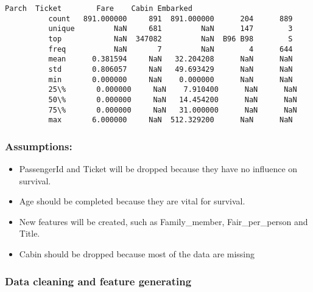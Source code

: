 \documentclass[11pt]{article}
\providecommand{\tightlist}{%
      \setlength{\itemsep}{0pt}\setlength{\parskip}{0pt}}
\begin{document}
\begin{Verbatim}[commandchars=\\\{\}]
                       Parch  Ticket        Fare    Cabin Embarked  
          count   891.000000     891  891.000000      204      889  
          unique         NaN     681         NaN      147        3  
          top            NaN  347082         NaN  B96 B98        S  
          freq           NaN       7         NaN        4      644  
          mean      0.381594     NaN   32.204208      NaN      NaN  
          std       0.806057     NaN   49.693429      NaN      NaN  
          min       0.000000     NaN    0.000000      NaN      NaN  
          25\%       0.000000     NaN    7.910400      NaN      NaN  
          50\%       0.000000     NaN   14.454200      NaN      NaN  
          75\%       0.000000     NaN   31.000000      NaN      NaN  
          max       6.000000     NaN  512.329200      NaN      NaN  
\end{Verbatim}
            
    \subsubsection{Assumptions:}\label{assumptions}

\begin{itemize}
\tightlist
\item
  PassengerId and Ticket will be dropped because they have no influence
  on survival.
\item
  Age should be completed because they are vital for survival.
\item
  New features will be created, such as Family\_member,
  Fair\_per\_person and Title.
\item
  Cabin should be dropped because most of the data are missing
\end{itemize}

    \subsubsection{Data cleaning and feature
generating}\label{data-cleaning-and-feature-generating}
\end{document}
